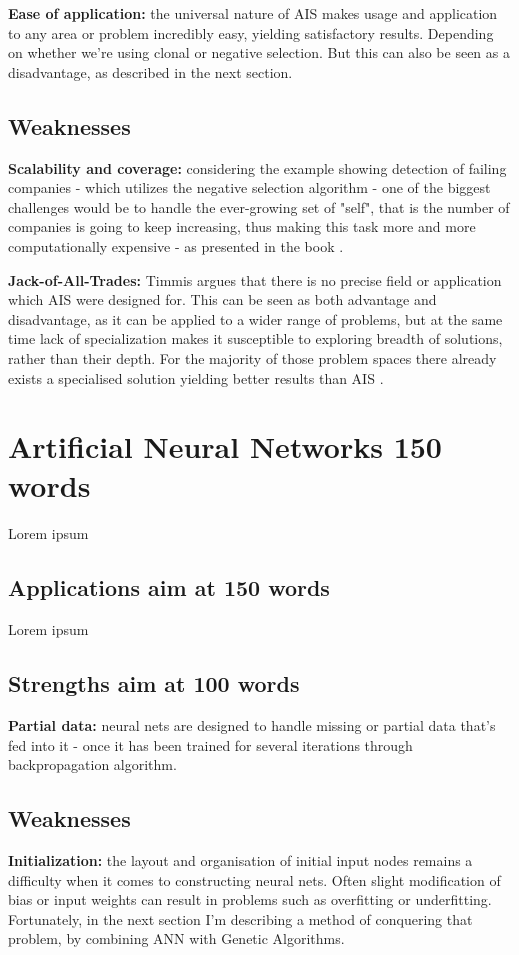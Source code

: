 \documentclass[letterpaper, 10 pt, conference]{ieeeconf}  %
\begin{document}
\textbf{Ease of application:} the universal nature of AIS makes usage and application to any area or problem incredibly easy, yielding satisfactory results. Depending on whether we're using clonal or negative selection. But this can also be seen as a disadvantage, as described in the next section.

\subsection{Weaknesses}
\textbf{Scalability and coverage:} considering the example showing detection of failing companies - which utilizes the negative selection algorithm - one of the biggest challenges would be to handle the ever-growing set of "self", that is the number of companies is going to keep increasing, thus making this task more and more computationally expensive - as presented in the book \cite{brabazon2006biologically}.

\textbf{Jack-of-All-Trades:} Timmis argues \cite{timmis2004overview} that there is no precise field or application which AIS were designed for. This can be seen as both advantage and disadvantage, as it can be applied to a wider range of problems, but at the same time lack of specialization makes it susceptible to exploring breadth of solutions, rather than their depth. For the majority of those problem spaces there already exists a specialised solution yielding better results than AIS \cite{garrett2005we}.

\section{Artificial Neural Networks 150 words}
Lorem ipsum

\subsection{Applications aim at 150 words}
Lorem ipsum

\subsection{Strengths aim at 100 words}
\textbf{Partial data:} neural nets are designed to handle missing or partial data that's fed into it - once it has been trained for several iterations through backpropagation algorithm.

\subsection{Weaknesses}
\textbf{Initialization:} the layout and organisation of initial input nodes remains a difficulty when it comes to constructing neural nets. Often slight modification of bias or input weights can result in problems such as overfitting or underfitting. Fortunately, in the next section I'm describing a method of conquering that problem, by combining ANN with Genetic Algorithms.
\end{document}
